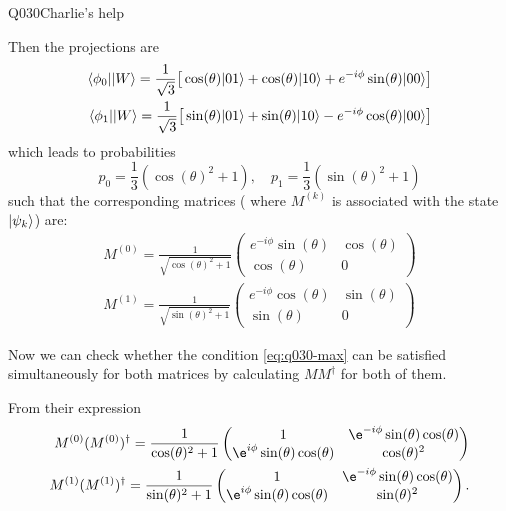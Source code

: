 \begin{entry}{Q030}{Charlie's help}
\begin{solution}[b)]
Then the projections are
\begin{equation}
\begin{split}
    \langle \phi_0 \rvert \lvert W \rangle = \frac{1}{\sqrt{3}} \big[ \cos(\theta)\lvert 01 \rangle + \cos(\theta)\lvert 10 \rangle + e^{-i\phi}\sin(\theta)\lvert 00 \rangle \big] \\
    \langle \phi_1 \rvert \lvert W \rangle = \frac{1}{\sqrt{3}} \big[ \sin(\theta)\lvert 01 \rangle + \sin(\theta)\lvert 10 \rangle - e^{-i\phi}\cos(\theta)\lvert 00 \rangle \big]
\end{split}
\end{equation}
which leads to probabilities
\begin{equation}
    p_0 = \frac{1}{3} (\cos(\theta)^{2} +1), \quad p_1= \frac{1}{3} (\sin(\theta)^{2} +1)
\end{equation}
such that the corresponding matrices ( where $M^{(k)}$ is associated with the state $\lvert \psi_k \rangle$) are:
\begin{equation}
\begin{split}
    M^{(0)} = \frac{1}{\sqrt{\cos(\theta)^{2} +1}}\begin{pmatrix}
        e^{-i\phi}\sin(\theta) & \cos(\theta) \\
        \cos(\theta) & 0
    \end{pmatrix} \\
    M^{(1)} = \frac{1}{\sqrt{\sin(\theta)^{2} +1}}\begin{pmatrix}
        e^{-i\phi}\cos(\theta) & \sin(\theta) \\
        \sin(\theta) & 0
    \end{pmatrix}
\end{split}
\end{equation}


Now we can check whether the condition \eqref{eq:q030-max} can be satisfied simultaneously for both matrices by calculating $MM^{\dagger}$ for both of them.

From their expression
\begin{equation}
\begin{split}
    M^{(0)}(M^{(0)})^{\dagger} = \frac{1}{\cos(\theta)^{2} +1}\begin{pmatrix}
        1 & \e^{-i\phi}\sin(\theta)\cos(\theta) \\
        \e^{i\phi}\sin(\theta)\cos(\theta) & \cos(\theta)^2
    \end{pmatrix} \\
    M^{(1)}(M^{(1)})^{\dagger} = \frac{1}{\sin(\theta)^{2} +1}\begin{pmatrix}
        1 & \e^{-i\phi}\sin(\theta)\cos(\theta) \\
        \e^{i\phi}\sin(\theta)\cos(\theta) & \sin(\theta)^2
    \end{pmatrix}.
\end{split}
\label{q030: conjugate matrices}
\end{equation}


\end{solution}
\end{entry}
